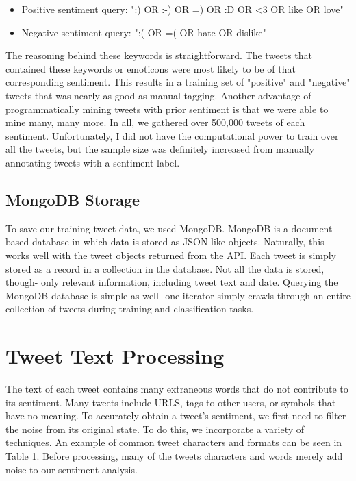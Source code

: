 \documentclass[preprint,pre,floats,aps,amsmath,amssymb,12pt]{revtex4}
\begin{document}
\begin{itemize}
\item Positive sentiment query: ":) OR :-) OR =) OR :D OR <3 OR like OR love"
\item Negative sentiment query: ":( OR =( OR hate OR dislike"
\end{itemize}

The reasoning behind these keywords is straightforward. The tweets that contained these keywords or emoticons were most likely to be of that corresponding sentiment. This results in a training set of "positive" and "negative" tweets that was nearly as good as manual tagging. Another advantage of programmatically mining tweets with prior sentiment is that we were able to mine many, many more. In all, we gathered over 500,000 tweets of each sentiment. Unfortunately, I did not have the computational power to train over all the tweets, but the sample size was definitely increased from manually annotating tweets with a sentiment label. 

\subsection{MongoDB Storage}

To save our training tweet data, we used MongoDB. MongoDB is a document based database in which data is stored as JSON-like objects. Naturally, this works well with the tweet objects returned from the API. Each tweet is simply stored as a record in a collection in the database. Not all the data is stored, though- only relevant information, including tweet text and date. Querying the MongoDB database is simple as well- one iterator simply crawls through an entire collection of tweets during training and classification tasks.  

\section{Tweet Text Processing}
\label{sec:txt}

The text of each tweet contains many extraneous words that do not contribute to its sentiment. Many tweets include URLS, tags to other users, or symbols that have no meaning. To accurately obtain a tweet's sentiment, we first need to filter the noise from its original state. To do this, we incorporate a variety of techniques. An example of common tweet characters and formats can be seen in Table 1. Before processing, many of the tweets characters and words merely add noise to our sentiment analysis. \\
\end{document}
